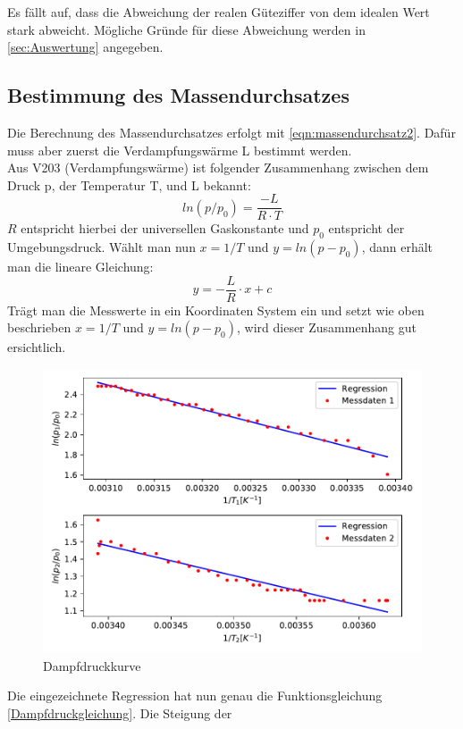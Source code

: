 Es fällt auf, dass die Abweichung der realen Güteziffer von dem idealen Wert stark abweicht.
Mögliche Gründe für diese Abweichung werden in \ref{sec:Auswertung} angegeben.

\subsection{Bestimmung des Massendurchsatzes}
Die Berechnung des Massendurchsatzes erfolgt mit \eqref{eqn:massendurchsatz2}. Dafür muss aber zuerst die
Verdampfungswärme L bestimmt werden.
\\
Aus V203 (Verdampfungswärme) ist folgender Zusammenhang zwischen dem Druck p, der Temperatur T, und L bekannt:
\begin{equation}
  ln(p/p_0)=\frac{-L}{R \cdot T}
\end{equation}
$R$ entspricht hierbei der universellen Gaskonstante und $p_0$ entspricht der Umgebungsdruck.
Wählt man nun $x=1/T$ und $y=ln(p-p_0)$, dann erhält man die lineare Gleichung:
\begin{equation}
  y=-\frac{L}{R}\cdot x+c \label{Dampfdruckgleichung}
\end{equation}
Trägt man die Messwerte in ein Koordinaten System ein und setzt wie oben beschrieben $x=1/T$ und $y=ln(p-p_0)$,
wird dieser Zusammenhang gut ersichtlich.
\begin{figure}
  \centering
  \includegraphics[scale = 0.75]{Druckverlaeufe.pdf}
  \caption{Dampfdruckkurve}
  \label{fig:Dampfdruckkurve}
\end{figure}
Die eingezeichnete Regression hat nun genau die Funktionsgleichung \eqref{Dampfdruckgleichung}. Die Steigung der
